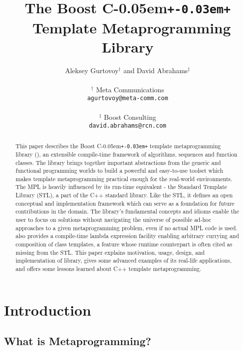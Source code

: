 \documentclass{netobjectdays}
\newcommand{\Cpp}{C\kern-0.05em\texttt{+\kern-0.03em+}%
}
\newcommand{\mpl}{\code{boost::mpl}}
\newcommand{\mping}{meta\-program\-ming}
\begin{document}
\title{The Boost \Cpp\ Template Metaprogramming Library}

\author{Aleksey Gurtovoy$^\dag$ and David Abrahams$^\ddag$ \\
\\
$^\dag$ Meta Communications \\
\texttt{agurtovoy@meta-comm.com}\\
\\
$^\ddag$ Boost Consulting \\
\texttt{david.abrahams@rcn.com}
}

\maketitle

\begin{abstract} $\!$This paper describes the Boost \Cpp template
\mping{} library (\mpl), an extensible compile-time framework
of algorithms, sequences and function classes. The library brings
together important abstractions from the generic and functional
programming worlds to build a powerful and easy-to-use
toolset which makes template \mping{}  practical
enough for the real-world environments. The MPL is heavily influenced
by its run-time equivalent - the Standard Template Library (STL), a
part of the C++ standard library. Like the STL, it defines an open
conceptual and implementation framework which can serve as a
foundation for future contributions in the domain. The library's
fundamental concepts and idioms enable the user to focus on solutions 
without navigating the universe of possible ad-hoc approaches to a 
given \mping{}  problem, even if no actual MPL code is used. 
{\mpl} also provides a compile-time lambda expression facility enabling
arbitrary currying and composition of class templates, a feature whose
runtime counterpart is often cited as missing from the STL. This paper
explains motivation, usage, design, and implementation of \mpl{} 
library, gives some advanced examples of its real-life applications, 
and offers some lessons learned about C++ template \mping{}.
\end{abstract}


\section{Introduction}

\subsection{What is Metaprogramming?}
\end{document}
